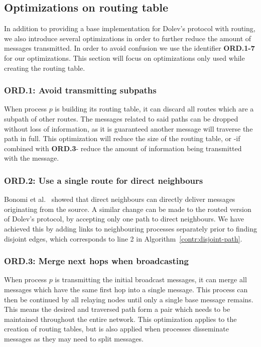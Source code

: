 \subsection{Optimizations on routing table}
In addition to providing a base implementation for Dolev's protocol with routing, we also introduce several optimizations in order to further reduce the amount of messages transmitted. In order to avoid confusion we use the identifier \textbf{ORD.1-7} for our optimizations. This section will focus on optimizations only used while creating the routing table.

\subsubsection{ORD.1: Avoid transmitting subpaths}
When process $p$ is building its routing table, it can discard all routes which are a subpath of other routes. The messages related to said paths can be dropped without loss of information, as it is guaranteed another message will traverse the path in full. This optimization will reduce the size of the routing table, or -if combined with \textbf{ORD.3}- reduce the amount of information being transmitted with the message.

\subsubsection{ORD.2: Use a single route for direct neighbours}
Bonomi et al.~\cite{bonomi2019multihop} showed that direct neighbours can directly deliver messages originating from the source. A similar change can be made to the routed version of Dolev's protocol, by accepting only one path to direct neighbours. We have achieved this by adding links to neighbouring processes separately prior to finding disjoint edges, which corresponds to line 2 in Algorithm~\ref{contr:disjoint-path}.

\subsubsection{ORD.3: Merge next hops when broadcasting}
When process $p$ is transmitting the initial broadcast messages, it can merge all messages which have the same first hop into a single message. This process can then be continued by all relaying nodes until only a single base message remains. This means the desired and traversed path form a pair which needs to be maintained throughout the entire network. This optimization applies to the creation of routing tables, but is also applied when processes disseminate messages as they may need to split messages.

